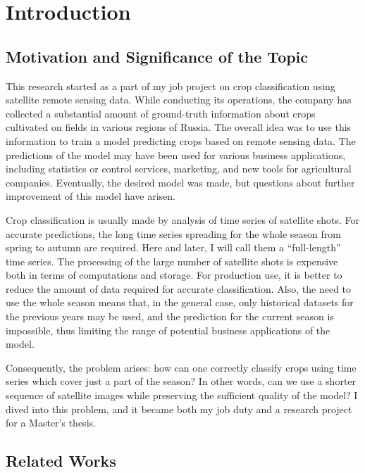 \documentclass{article}
\begin{document}



\newpage

\tableofcontents
\newpage

\section{Introduction}

\subsection{Motivation and Significance of the Topic}
This research started as a part of my job project on crop classification using satellite remote sensing data. While conducting its operations, the company has collected a substantial amount of ground-truth information about crops cultivated on fields in various regions of Russia. The overall idea was to use this information to train a model predicting crops based on remote sensing data. The predictions of the model may have been used for various business applications, including statistics or control services, marketing, and new tools for agricultural companies. Eventually, the desired model was made, but questions about further improvement of this model have arisen.

Crop classification is usually made by analysis of time series of satellite shots. For accurate predictions, the long time series spreading for the whole season from spring to autumn are required. Here and later, I will call them a “full-length” time series. The processing of the large number of satellite shots is expensive both in terms of computations and storage. For production use, it is better to reduce the amount of data required for accurate classification. Also, the need to use the whole season means that, in the general case, only historical datasets for the previous years may be used, and the prediction for the current season is impossible, thus limiting the range of potential business applications of the model.

Consequently, the problem arises: how can one correctly classify crops using time series which cover just a part of the season? In other words, can we use a shorter sequence of satellite images while preserving the sufficient quality of the model? I dived into this problem, and it became both my job duty and a research project for a Master's thesis.

\subsection{Related Works}
\end{document}
